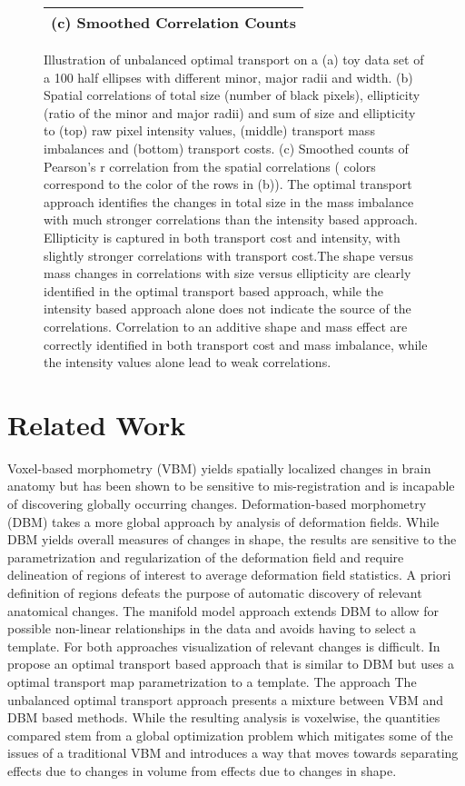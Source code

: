 \documentclass{llncs}
\begin{document}
\begin{figure}
\begin{tabular}{|c|}
        (c) Smoothed Correlation Counts\\
        \hline
\end{tabular}
\caption{\label{fig:cor-ellipse}
Illustration of unbalanced optimal transport on a (a) toy data set of a 100
half ellipses with different minor, major radii and width.  (b) Spatial
correlations of total size (number of black pixels), ellipticity (ratio of the
minor and major radii) and sum of size and ellipticity to (top) raw pixel
intensity values, (middle) transport mass imbalances and (bottom)
transport costs. (c) Smoothed counts of Pearson's r correlation from the
spatial correlations ( colors correspond to the color of the rows in (b)). The
optimal transport approach identifies the changes in total size in the mass
imbalance with much stronger correlations than the intensity based approach.
Ellipticity is captured in both transport cost and intensity, with slightly
stronger correlations with transport cost.The shape versus mass changes in
correlations with size versus ellipticity are clearly identified in the optimal
transport based approach, while the intensity based approach alone does not
indicate the source of the correlations.  Correlation to an additive shape and
mass effect are correctly identified in both transport cost and mass imbalance,
while the intensity values alone lead to weak correlations.
}
\end{figure}

\section{Related Work}

Voxel-based morphometry (VBM) yields spatially localized changes in brain
anatomy but has been shown to be sensitive to mis-registration and is incapable
of discovering globally occurring changes. 
Deformation-based morphometry (DBM) takes
a more global approach by analysis of deformation fields. While DBM yields
overall measures of changes in shape, the results are sensitive to the
parametrization and regularization of the deformation field and require
delineation of regions of interest to average deformation field statistics. A
priori definition of regions defeats the purpose of automatic discovery of
relevant anatomical changes. 
The manifold model approach extends DBM to allow for possible non-linear
relationships in the data and avoids having to select a template.
For both approaches visualization of relevant changes is difficult.
In \cite{} propose an optimal transport based approach that is similar to DBM
but uses a optimal transport map parametrization to a template. The approach 
The unbalanced optimal transport approach presents a mixture between VBM and
DBM based methods.  While the resulting analysis is voxelwise, the quantities
compared stem from a global optimization problem which mitigates some of the
issues of a traditional VBM and introduces a way that moves towards separating
effects due to changes in volume from effects due to changes in shape.
\end{document}

